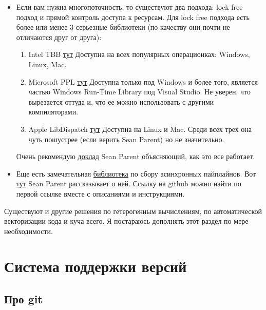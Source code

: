 \documentclass{article}
\begin{document}
\begin{itemize}
\item Если вам нужна многопоточность, то существуют два подхода: lock free подход и прямой контроль доступа к ресурсам. Для lock free подхода есть более или менее 3 серьезные библиотеки (по качеству они почти не отличаются друг от друга):
\begin{enumerate}
\item Intel TBB \href{https://software.intel.com/content/www/us/en/develop/tools/oneapi/components/onetbb.html}{тут} Доступна на всех популярных операционках: Windows, Linux, Mac.
\item Microsoft PPL \href{https://docs.microsoft.com/en-us/cpp/parallel/concrt/parallel-patterns-library-ppl?view=msvc-160}{тут} Доступна только под Windows и более того, является частью Windows Run-Time Library под Visual Studio. Не уверен, что вырезается оттуда и, что ее можно использовать с другими компиляторами.
\item Apple LibDispatch \href{https://github.com/apple/swift-corelibs-libdispatch}{тут} Доступна на Linux и Mac. Среди всех трех она чуть пошустрее (если верить Sean Parent) но не значительно.
\end{enumerate}
Очень рекомендую \href{https://www.youtube.com/watch?v=QIHy8pXbneI}{доклад} Sean Parent объясняющий, как это все работает.

\item Еще есть замечательная \href{https://stlab.cc/}{библиотека} по сбору асинхронных пайплайнов. Вот \href{https://www.youtube.com/watch?v=0ZS_-G4urko}{тут} Sean Parent рассказывает о ней. Ссылку на github можно найти по первой ссылке вместе с описаниями и инструкциями.
\end{itemize}

Существуют и другие решения по гетерогенным вычислениям, по автоматической векторизации кода и куча всего. Я постараюсь дополнять этот раздел по мере необходимости.



\section{Система поддержки версий}

\subsection{Про git}
\end{document}
